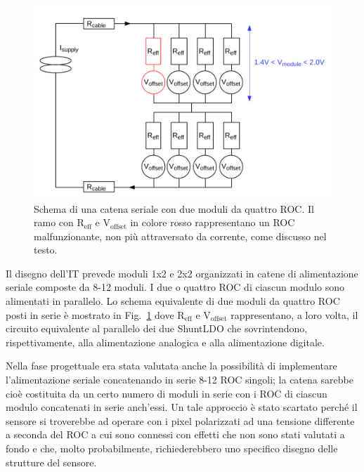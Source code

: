 \begin{figure}
\centering
\includegraphics[scale=.3]{Immagini/MultiChipModules}
\caption{Schema di una catena seriale con due moduli da quattro ROC. Il ramo con $\mathrm{R_{eff}}$ e $\mathrm{V_{offset}}$ in colore rosso rappresentano un ROC malfunzionante, non pi\`u attraversato da corrente, come discusso nel testo.}
\label{MCM}
\end{figure}

Il disegno dell'IT prevede moduli 1x2 e 2x2 organizzati in catene di alimentazione seriale composte da 8-12 moduli. I due o quattro ROC di ciascun modulo sono alimentati in parallelo. Lo schema equivalente di due moduli da quattro ROC posti in serie \`e mostrato in Fig.~\ref{MCM} dove $\mathrm{R_{eff}}$ e $\mathrm{V_{offset}}$ rappresentano, a loro volta, il circuito equivalente al parallelo dei due ShuntLDO che sovrintendono, rispettivamente, alla alimentazione analogica e alla alimentazione digitale.

Nella fase progettuale era stata valutata anche la possibilit\`a di implementare l'alimentazione seriale concatenando in serie 8-12 ROC singoli; la catena sarebbe cio\`e costituita da un certo numero di moduli in serie con i ROC di ciascun modulo concatenati in serie anch'essi. Un tale approccio \`e stato scartato perch\'e il sensore si troverebbe ad operare con i pixel polarizzati ad una tensione differente a seconda del ROC a cui sono connessi con effetti che non sono stati valutati a fondo e che, molto probabilmente, richiederebbero uno specifico disegno delle strutture del sensore.

